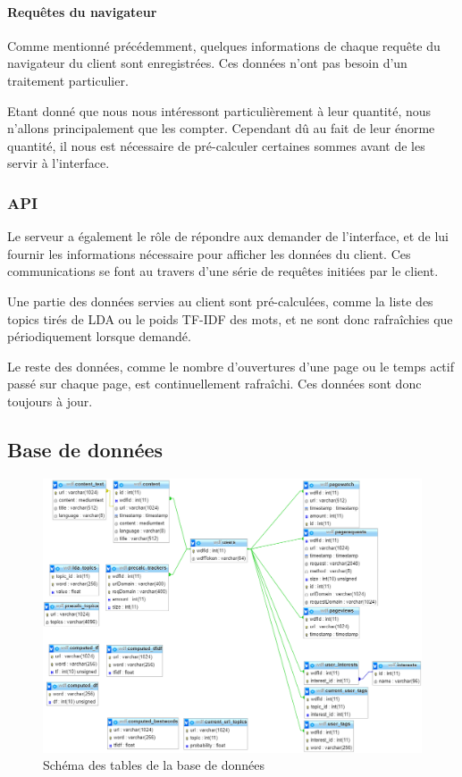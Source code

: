 			\paragraph{Requêtes du navigateur}

				Comme mentionné précédemment, quelques informations de chaque requête du navigateur du client sont enregistrées. Ces données n'ont pas besoin d'un traitement particulier.

				Etant donné que nous nous intéressont particulièrement à leur quantité, nous n'allons principalement que les compter. Cependant dû au fait de leur énorme quantité, il nous est nécessaire de pré-calculer certaines sommes avant de les servir à l'interface.

		\subsubsection{API}

			Le serveur a également le rôle de répondre aux demander de l'interface, et de lui fournir les informations nécessaire pour afficher les données du client. Ces communications se font au travers d'une série de requêtes initiées par le client.

			Une partie des données servies au client sont pré-calculées, comme la liste des topics tirés de LDA ou le poids TF-IDF des mots, et ne sont donc rafraîchies que périodiquement lorsque demandé.

			Le reste des données, comme le nombre d'ouvertures d'une page ou le temps actif passé sur chaque page, est continuellement rafraîchi. Ces données sont donc toujours à jour.

	\subsection{Base de données}

		\begin{figure}[!h]
			\centering
			\includegraphics[height=0.8\textwidth]{images/design/db}
			\caption{Schéma des tables de la base de données}
			\label{db}
		\end{figure}

